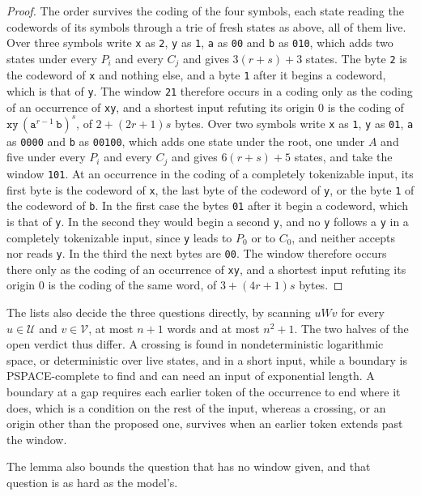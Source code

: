 \documentclass[11pt,a4paper]{article}
\theoremstyle{definition}
\theoremstyle{plain}
\newcommand{\code}[1]{\texttt{#1}}
\begin{document}
\begin{proof}
The order survives the coding of the four symbols, each state reading the codewords of its symbols through a trie of
fresh states as above, all of them live. Over three symbols write \code{x} as \code{2}, \code{y} as \code{1}, \code{a}
as \code{00} and \code{b} as \code{010}, which adds two states under every $P_i$ and every $C_j$ and gives
$3 (r + s) + 3$ states. The byte \code{2} is the codeword of \code{x} and nothing else, and a byte \code{1} after it
begins a codeword, which is that of \code{y}. The window \code{21} therefore occurs in a coding only as the coding of an
occurrence of \code{xy}, and a shortest input refuting its origin $0$ is the coding of
$\code{xy}\, (\code{a}^{r-1}\, \code{b})^s$, of $2 + (2 r + 1) s$ bytes. Over two symbols write \code{x} as \code{1},
\code{y} as \code{01}, \code{a} as \code{0000} and \code{b} as \code{00100}, which adds one state under the root, one
under $A$ and five under every $P_i$ and every $C_j$ and gives $6 (r + s) + 5$ states, and take the window \code{101}.
At an occurrence in the coding of a completely tokenizable input, its first byte is the codeword of \code{x}, the last
byte of the codeword of \code{y}, or the byte \code{1} of the codeword of \code{b}. In the first case the bytes
\code{01} after it begin a codeword, which is that of \code{y}. In the second they would begin a second \code{y}, and no
\code{y} follows a \code{y} in a completely tokenizable input, since \code{y} leads to $P_0$ or to $C_0$, and neither
accepts nor reads \code{y}. In the third the next bytes are \code{00}. The window therefore occurs there only as the
coding of an occurrence of \code{xy}, and a shortest input refuting its origin $0$ is the coding of the same word, of
$3 + (4 r + 1) s$ bytes.
\end{proof}

The lists also decide the three questions directly, by scanning $u W v$ for every $u \in \mathcal{U}$ and
$v \in \mathcal{V}$, at most $n + 1$ words and at most $n^2 + 1$. The two halves of the open verdict thus differ. A
crossing is found in nondeterministic logarithmic space, or deterministic over live states, and in a short input, while
a boundary is PSPACE-complete to find and can need an input of exponential length. A boundary at a gap requires each
earlier token of the occurrence to end where it does, which is a condition on the rest of the input, whereas a crossing,
or an origin other than the proposed one, survives when an earlier token extends past the window.

The lemma also bounds the question that has no window given, and that question is as hard as the model's.
\end{document}
